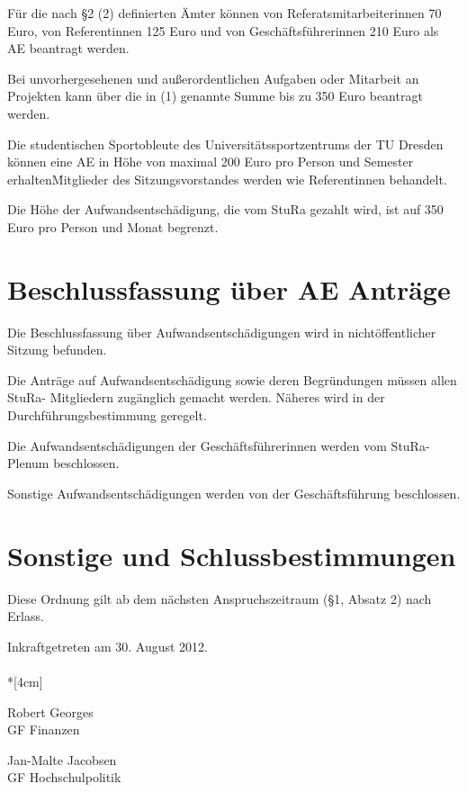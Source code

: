 \begin{multicols}{2}
\Abs \Satz Für die nach §2 (2) definierten Ämter können von Referatsmitarbeiterinnen 70 Euro, von Referentinnen 125 Euro und von Geschäftsführerinnen 210 Euro als AE beantragt werden.

\Abs \Satz Bei unvorhergesehenen und außerordentlichen Aufgaben oder Mitarbeit an Projekten kann über die in (1) genannte Summe bis zu 350 Euro beantragt werden.

\Abs \Satz  Die studentischen Sportobleute des Universitätssportzentrums der TU Dresden können eine AE in Höhe von maximal 200 Euro pro Person und Semester erhalten\. Mitglieder des Sitzungsvorstandes werden wie Referentinnen behandelt.

\Abs \Satz Die Höhe der Aufwandsentschädigung, die vom StuRa gezahlt wird, ist auf 350 Euro pro Person und Monat begrenzt. 

\section{Beschlussfassung über AE Anträge}

\Abs \Satz Die Beschlussfassung über Aufwandsentschädigungen wird in nichtöffentlicher Sitzung befunden.

\Abs \Satz Die Anträge auf Aufwandsentschädigung sowie deren Begründungen müssen allen StuRa- Mitgliedern zugänglich gemacht werden. Näheres wird in der Durchführungsbestimmung geregelt.

\Abs \Satz Die Aufwandsentschädigungen der Geschäftsführerinnen werden vom StuRa-Plenum beschlossen.

\Abs \Satz Sonstige Aufwandsentschädigungen werden von der Geschäftsführung beschlossen.


\section{Sonstige und Schlussbestimmungen}

\Abs \Satz Diese Ordnung gilt ab dem nächsten Anspruchszeitraum (§1, Absatz 2) nach Erlass.

\end{multicols}

\nopagebreak
\vspace{1cm}

\footnotesize
Inkraftgetreten am 30. August 2012.\\


\normalsize
~\\*[4cm]
\begin{center}
\hspace*{\fill}
\parbox{7cm}{Robert Georges\\GF Finanzen}
\hfill\parbox{7cm}{Jan-Malte Jacobsen \\GF Hochschulpolitik}
\hspace*{\fill}
\end{center}
